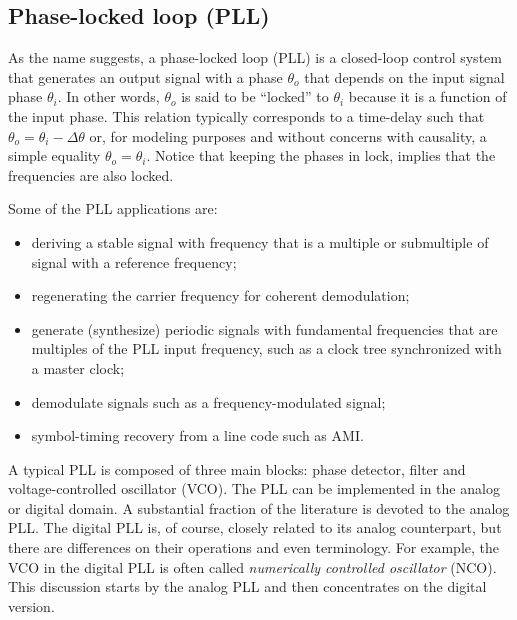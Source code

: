 \subsection{Phase-locked loop (PLL)}
\label{sec:pll}

As the name suggests, a phase-locked loop (PLL) is a closed-loop control system
that generates an output signal with a phase
$\theta_o$ that depends on the input signal phase $\theta_i$. In other words, $\theta_o$ is said to be ``locked'' to $\theta_i$ because it is a function of the input phase. This relation typically corresponds to a time-delay such that $\theta_o = \theta_i - \Delta \theta$ or, for modeling purposes and without concerns with causality, a simple equality $\theta_o = \theta_i$. Notice that keeping the phases in lock, implies that the frequencies are also locked.

Some of the PLL applications are:
\begin{itemize}
	\item deriving a stable signal with frequency that is a multiple or submultiple of signal with a reference frequency;
	\item regenerating the carrier frequency for coherent demodulation;
	\item generate (synthesize) periodic signals with fundamental frequencies that are multiples of the PLL input frequency, such as a clock tree synchronized with a master clock;
	\item demodulate signals such as a frequency-modulated signal;
	\item symbol-timing recovery from a line code such as AMI.
\end{itemize}

A typical PLL is composed of three main blocks: phase detector, filter and voltage-controlled oscillator (VCO). 
The PLL can be implemented in the analog or digital domain. A substantial fraction of the literature is devoted to the analog PLL. The digital PLL is, of course, closely related to its analog counterpart, but there are differences on their operations and even terminology. For example, the VCO in the digital PLL is often called \emph{numerically controlled oscillator} (NCO). This discussion starts by the analog PLL and then concentrates on the digital version.


